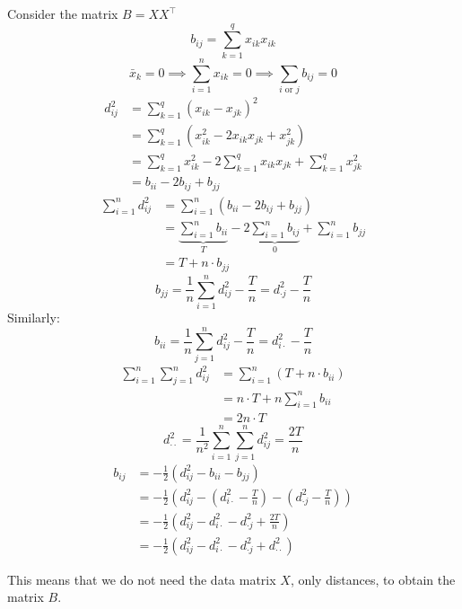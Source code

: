 \documentclass[a4paper]{article}
\begin{document}
Consider the matrix $B=XX^{\intercal}$
\[b_{ij}=\sum_{k=1}^{q}x_{ik}x_{ik} \]
\[\bar{x}_k=0\implies\sum_{i=1}^{n}x_{ik}=0\implies\sum_{i\text{ or }j}b_{ij}=0 \]
\begin{align*}
    d_{ij}^2&=\sum_{k=1}^{q}(x_{ik}-x_{jk})^2 \\
    &=\sum_{k=1}^{q}(x_{ik}^2-2x_{ik}x_{jk}+x_{jk}^2) \\
    &=\sum_{k=1}^{q}x_{ik}^2-2\sum_{k=1}^{q}x_{ik}x_{jk}+\sum_{k=1}^{q}x_{jk}^2 \\
    &=b_{ii}-2b_{ij}+b_{jj}
\end{align*}
\begin{align*}
    \sum_{i=1}^{n}d_{ij}^2&=\sum_{i=1}^{n}(b_{ii}-2b_{ij}+b_{jj}) \\
    &=\underbrace{\sum_{i=1}^{n}b_{ii}}_{T}-2\underbrace{\sum_{i=1}^{n}b_{ij}}_{0}+\sum_{i=1}^{n}b_{jj} \\
    &=T+n\cdot b_{jj}
\end{align*}
\[b_{jj}=\frac{1}{n}\sum_{i=1}^{n}d_{ij}^2-\frac{T}{n}=d_{\cdot j}^2-\frac{T}{n} \]
Similarly:
\[b_{ii}=\frac{1}{n}\sum_{j=1}^{n}d_{ij}^2-\frac{T}{n}=d_{i\cdot}^2-\frac{T}{n} \]
\begin{align*}
    \sum_{i=1}^{n}\sum_{j=1}^{n}d_{ij}^2
    &=\sum_{i=1}^{n}(T+n\cdot b_{ii}) \\
    &=n\cdot T + n\sum_{i=1}^{n}b_{ii} \\
    &=2n\cdot T
\end{align*}
\[d_{\cdot\cdot}^2=\frac{1}{n^2}\sum_{i=1}^{n}\sum_{j=1}^{n}d_{ij}^2=\frac{2T}{n} \]
\begin{align*}
    b_{ij}&=-\frac{1}{2}(d_{ij}^2-b_{ii}-b_{jj} ) \\
    &=-\frac{1}{2}\left(d_{ij}^2-\left(d_{i\cdot}^2-\frac{T}{n}\right)-\left(d_{\cdot j}^2-\frac{T}{n}\right) \right) \\
    &=-\frac{1}{2}\left(d_{ij}^2-d_{i\cdot}^2-d_{\cdot j}^2+\frac{2T}{n} \right) \\
    &=-\frac{1}{2}(d_{ij}^2-d_{i\cdot}^2-d_{\cdot j}^2+d_{\cdot\cdot}^2)
\end{align*}

This means that we do not need the data matrix $X$, only distances, to obtain the matrix $B$.
\end{document}
